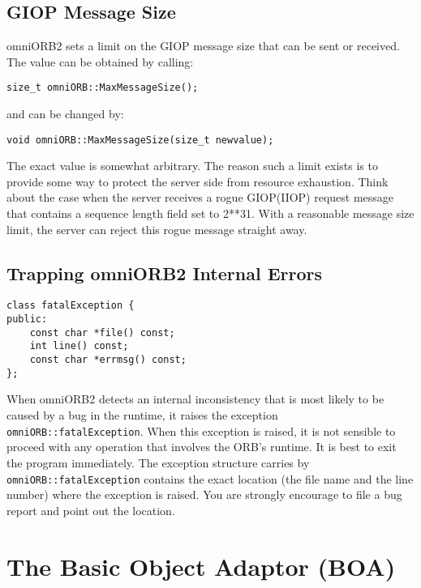 \documentclass[11pt,twoside,onecolumn]{book}
\begin{document}
\section{GIOP Message Size}

omniORB2 sets a limit on the GIOP message size that can be sent or
received. The value can be obtained by calling:

{\small
\begin{verbatim}
size_t omniORB::MaxMessageSize();
\end{verbatim}
}

and can be changed by:

{\small
\begin{verbatim}
void omniORB::MaxMessageSize(size_t newvalue);
\end{verbatim}
}

The exact value is somewhat arbitrary. The reason such a limit exists is to
provide some way to protect the server side from resource exhaustion. Think
about the case when the server receives a rogue GIOP(IIOP) request message
that contains a sequence length field set to 2**31. With a reasonable
message size limit, the server can reject this rogue message straight away.


\section{Trapping omniORB2 Internal Errors}

{\small
\begin{verbatim}
class fatalException {
public:
    const char *file() const;
    int line() const;
    const char *errmsg() const;
};
\end{verbatim}
}

When omniORB2 detects an internal inconsistency that is most likely to be
caused by a bug in the runtime, it raises the exception {\tt
omniORB::fatalException}.  When this exception is raised, it is not
sensible to proceed with any operation that involves the ORB's runtime. It
is best to exit the program immediately. The exception structure carries by
{\tt omniORB::fatalException} contains the exact location (the file name
and the line number) where the exception is raised. You are strongly
encourage to file a bug report and point out the location.


\chapter{The Basic Object Adaptor (BOA)}
\end{document}
